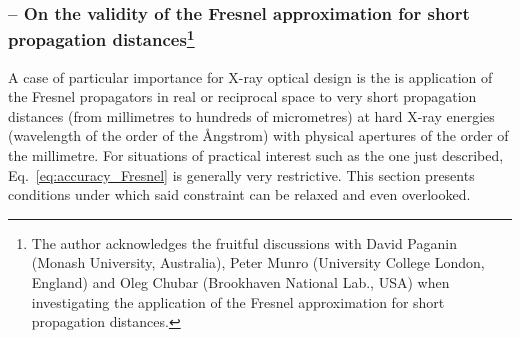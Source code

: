 \begin{refsection}
\subsubsection*{-- On the validity of the Fresnel approximation for short propagation distances\footnote{The author acknowledges the fruitful discussions with David Paganin (Monash University, Australia), Peter Munro (University College London, England) and Oleg Chubar (Brookhaven National Lab., USA) when investigating the application of the Fresnel approximation for short propagation distances.}}

A case of particular importance for X-ray optical design is the is application of the Fresnel propagators in real or reciprocal space to very short propagation distances (from millimetres to hundreds of micrometres) at hard X-ray energies (wavelength of the order of the \r{A}ngstrom) with physical apertures of the order of the millimetre. For situations of practical interest such as the one just described, Eq.~\ref{eq:accuracy_Fresnel} is generally very restrictive. This section presents conditions under which said constraint can be relaxed and even overlooked. 


\end{refsection}
